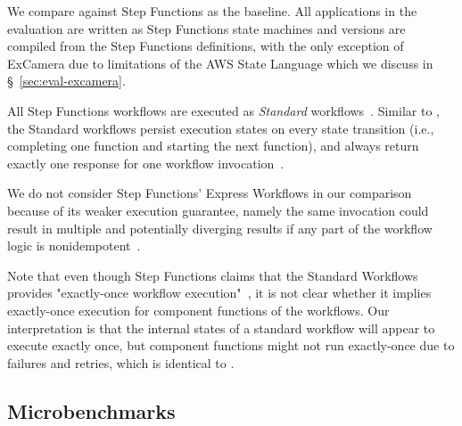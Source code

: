 We compare against Step Functions as the baseline. All applications in the
evaluation are written as Step Functions state machines and \name{} versions
are compiled from the Step Functions definitions, with the only exception of
ExCamera due to limitations of the AWS State Language which we discuss in
\S~\ref{sec:eval-excamera}.



All Step Functions workflows are executed as \emph{Standard}
workflows~\cite{aws-step-functions-standard-vs-express}. Similar to \name{},
the Standard workflows persist execution states on every state transition
(i.e., completing one function and starting the next function), and always
return exactly one response for one workflow
invocation~\cite{aws-step-functions-exec-gntee}.

We do not consider Step Functions' Express Workflows in our comparison because
of its weaker execution guarantee, namely the same invocation could result in
multiple and potentially diverging results if any part of the workflow logic
is nonidempotent~\cite{aws-step-functions-exec-gntee}.

Note that even though Step Functions claims that the Standard Workflows
provides "exactly-once workflow
execution"~\cite{aws-step-functions-exec-gntee}, it is not clear whether it
implies exactly-once execution for component functions of the workflows. Our
interpretation is that the internal states of a standard workflow will appear
to execute exactly once, but component functions might not run exactly-once
due to failures and retries, which is identical to \name{}. 

\subsection{Microbenchmarks}


